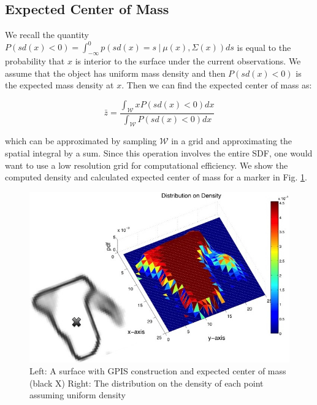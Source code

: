\documentclass[journal,transmag]{IEEEtran}%
\begin{document}
\subsection{Expected Center of Mass}\label{sec:mass} 

We recall the quantity $P(sd(x) < 0) = \int_{-\infty}^{0} p(sd(x) =  s \ | \ \mu(x),\Sigma(x)) ds$ is equal to the probability that $x$ is interior to the surface under the current observations.
We assume that the object has uniform mass density and then $P(sd(x) < 0)$ is the expected mass density at $x$.
Then we can find the expected center of mass as:

\label{eq:mass}
\begin{equation}
  \bar{z} 
  =
  \frac
    {\int_{\mathcal{W}}x P(sd(x)<0) dx}
    {\int_{\mathcal{W}}  P(sd(x)<0) dx}
\end{equation}

which can be approximated by sampling $\mathcal{W}$ in a grid and approximating the spatial integral by a sum. Since this operation involves the entire SDF, one would want to use a low resolution grid for computational efficiency. We show the computed density and calculated expected center of mass for a marker in Fig. \ref{fig:GPIS_MASS}.


\begin{figure}[ht!]
\centering
\includegraphics[scale = 0.3]{figures/Slide06.jpg}
\caption{ \footnotesize Left: A surface with GPIS construction and expected center of mass (black X)
Right: The distribution on the density of each point assuming uniform density}
\vspace*{-10pt}
\label{fig:GPIS_MASS}
\end{figure}
\end{document}
